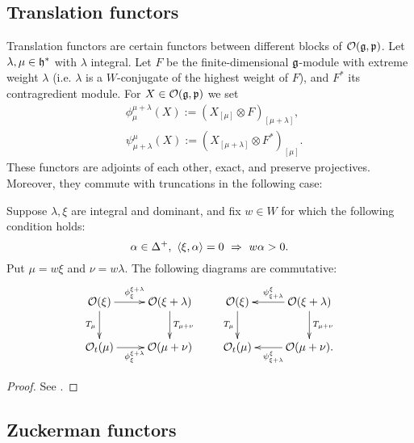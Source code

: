 \documentclass[a4paper,10pt]{article}
\begin{document}
\subsection{Translation functors}

Translation functors are certain functors between different blocks of $\mathcal{O}(\mathfrak{g,p})$.
Let $\lambda, \mu \in \mathfrak{h}^\ast$ with $\lambda$ integral. Let $F$ be the finite-dimensional $\mathfrak{g}$-module with extreme weight $\lambda$ (i.e. $\lambda$ is a $W$-conjugate of the highest weight of $F$), and $F^\ast$ its contragredient module. For $X \in \mathcal{O}(\mathfrak{g,p})$ we set
%
\begin{align*}
& \phi_{\mu}^{\mu + \lambda} (X) :=  (X_{[\mu]} \otimes F)_{[\mu + \lambda]}, \\
& \psi^{\mu}_{\mu + \lambda} (X) :=  (X_{[\mu+\lambda]} \otimes F^\ast)_{[\mu]}.
\end{align*}
%
These functors are adjoints of each other, exact, and preserve projectives. Moreover, they commute with truncations in the following case:
%
\begin{lemma}
\label{lemma:translation_truncation}
Suppose $\lambda,\xi$ are integral and dominant, and fix $w \in W$ for which the following condition holds:
%
\[ \alpha \in \Delta^+, \ \killing{\xi}{\alpha}=0 \ \Rightarrow \ w \alpha >0. \]
%
Put $\mu=w \xi$ and $\nu=w\lambda$. The following diagrams are commutative:
%
\[ \xymatrix{\mathcal{O}(\xi) \ar[r]^{\phi^{\xi+\lambda}_{\xi}} \ar[d]_{T_\mu} & \mathcal{O}(\xi +\lambda) \ar[d]^{T_{\mu+\nu}} \\
\mathcal{O}_t(\mu) \ar[r]_{\phi^{\xi+\lambda}_{\xi}} & \mathcal{O}(\mu +\nu)} \qquad \xymatrix{\mathcal{O}(\xi)  \ar[d]_{T_\mu} & \mathcal{O}(\xi +\lambda) \ar[d]^{T_{\mu+\nu}} \ar[l]_{\psi_{\xi+\lambda}^{\xi}} \\
\mathcal{O}_t(\mu) & \mathcal{O}(\mu +\nu) \ar[l]^{\psi_{\xi+\lambda}^{\xi}} . } \]
%
\end{lemma}
\begin{proof}
See \cite[\S3.]{es}.
\end{proof}

\subsection{Zuckerman functors}
\end{document}
